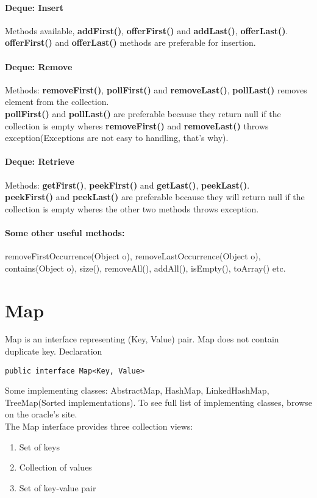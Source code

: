 \documentclass[10 pt]{article}
\newcommand{\I}{\item}
\begin{document}
\paragraph{Deque: Insert}
Methods available, \textbf{addFirst()}, \textbf{offerFirst()} and \textbf{addLast()}, \textbf{offerLast()}. \\
\textbf{offerFirst()} and \textbf{offerLast()} methods are preferable for insertion.
\paragraph{Deque: Remove}
Methods: \textbf{removeFirst()}, \textbf{pollFirst()} and \textbf{removeLast()}, \textbf{pollLast()} removes element from the collection. \\
\textbf{pollFirst()} and \textbf{pollLast()} are preferable because they return null if the collection is empty wheres \textbf{removeFirst()} and \textbf{removeLast()} throws exception(Exceptions are not easy to handling, that's why).
\paragraph{Deque: Retrieve}
Methods: \textbf{getFirst()}, \textbf{peekFirst()} and \textbf{getLast()}, \textbf{peekLast()}. \\
\textbf{peekFirst()} and \textbf{peekLast()} are preferable because they will return null if the collection is empty wheres the other two methods throws exception. \\
\paragraph{Some other useful methods:} removeFirstOccurrence(Object o), removeLastOccurrence(Object o), contains(Object o), size(), removeAll(), addAll(), isEmpty(), toArray() etc.

\section{Map}
Map is an interface representing (Key, Value) pair. Map does not contain duplicate key. Declaration
\begin{lstlisting}
public interface Map<Key, Value>
\end{lstlisting}
Some implementing classes: AbstractMap, HashMap, LinkedHashMap, TreeMap(Sorted implementations). To see full list of implementing classes, browse on the oracle's site. \\
The Map interface provides three collection views:
\begin{enumerate}
	\I Set of keys
	\I Collection of values
	\I Set of key-value pair
\end{enumerate}
\end{document}
